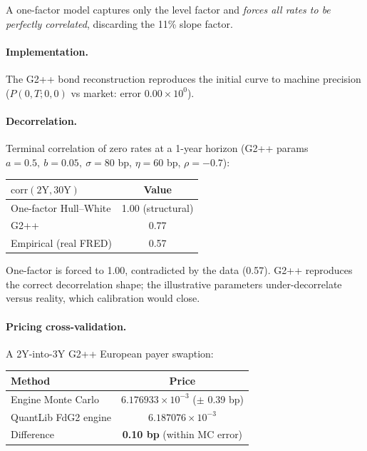 \documentclass[11pt]{article}
\begin{document}
\noindent A one-factor model captures only the level factor and \emph{forces all rates to
be perfectly correlated}, discarding the 11\% slope factor.

\paragraph{Implementation.} The G2++ bond reconstruction reproduces the initial curve to
machine precision ($P(0,T;0,0)$ vs market: error $0.00\times10^{0}$).

\paragraph{Decorrelation.} Terminal correlation of zero rates at a 1-year horizon (G2++
params $a=0.5,\ b=0.05,\ \sigma=80$ bp, $\eta=60$ bp, $\rho=-0.7$):

\begin{center}
\begin{tabular}{lc}
\toprule
$\mathrm{corr}(\text{2Y}, \text{30Y})$ & Value \\
\midrule
One-factor Hull--White & 1.00 (structural) \\
G2++ & 0.77 \\
Empirical (real FRED) & 0.57 \\
\bottomrule
\end{tabular}
\end{center}

\noindent One-factor is forced to 1.00, contradicted by the data (0.57). G2++ reproduces
the correct decorrelation shape; the illustrative parameters under-decorrelate versus
reality, which calibration would close.

\paragraph{Pricing cross-validation.} A 2Y-into-3Y G2++ European payer swaption:

\begin{center}
\begin{tabular}{lc}
\toprule
Method & Price \\
\midrule
Engine Monte Carlo & $6.176933\times10^{-3}$ ($\pm$ 0.39 bp) \\
QuantLib FdG2 engine & $6.187076\times10^{-3}$ \\
Difference & \textbf{0.10 bp} (within MC error) \\
\bottomrule
\end{tabular}
\end{center}
\end{document}
